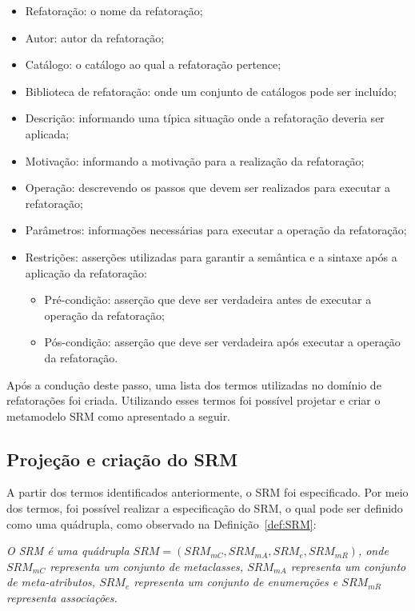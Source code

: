 \begin{itemize}
\item Refatoração: o nome da refatoração;
\item Autor: autor da refatoração;
\item Catálogo: o catálogo ao qual a refatoração pertence;
\item Biblioteca de refatoração: onde um conjunto de catálogos pode ser incluído;
\item Descrição: informando uma típica situação onde a refatoração deveria ser aplicada;
\item Motivação: informando a motivação para a realização da refatoração;
\item Operação: descrevendo os passos que devem ser realizados para executar a refatoração;
\item Parâmetros: informações necessárias para executar a operação da refatoração;
\item Restrições: asserções utilizadas para garantir a semântica e a sintaxe após a aplicação da refatoração:
\begin{itemize}
\item Pré-condição: asserção que deve ser verdadeira antes de executar a operação da refatoração;
\item Pós-condição: asserção que deve ser verdadeira após executar a operação da refatoração.
\end{itemize}
\end{itemize}


Após a condução deste passo, uma lista dos termos utilizadas no domínio de refatorações foi criada. Utilizando esses termos foi possível projetar e criar o metamodelo SRM como apresentado a seguir.

\subsection{Projeção e criação do SRM}

A partir dos termos identificados anteriormente, o SRM foi especificado. Por meio dos termos, foi possível realizar a especificação do SRM, o qual pode ser definido como uma quádrupla, como observado na Definição~\ref{def:SRM}: 

\begin{definicao}\label{def:SRM}
    \textit{O SRM é uma quádrupla $SRM = (SRM_{mC}, SRM_{mA}, SRM_{e}, SRM_{mR})$, onde $SRM_{mC} $ representa um conjunto de metaclasses, $SRM_{mA}$ representa um conjunto de meta-atributos, $SRM_{e}$ representa um conjunto de enumerações e $SRM_{mR}$ representa associações.}
\end{definicao}

